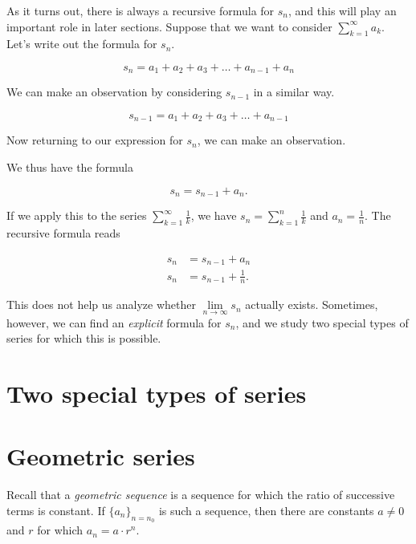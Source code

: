 \documentclass{ximera}
\begin{document}
As it turns out, there is always a recursive formula for $s_n$, and this will play an important role in later sections.  Suppose that we want to consider $\sum\limits_{k=1}^{\infty} a_k$.  Let's write out the formula for $s_n$.

\[
s_n = a_1+a_2+a_3+\ldots+a_{n-1}+a_n
\]

We can make an observation by considering $s_{n-1}$ in a similar way.

\[
s_{n-1} = a_1+a_2+a_3+\ldots+a_{n-1}
\]

Now returning to our expression for $s_n$, we can make an observation. 
\begin{image}
  \end{image}

We thus have the formula 

\[
s_n = s_{n-1}+a_n.
\]

If we apply this to the series $\sum\limits_{k=1}^{\infty} \frac{1}{k}$, we have $s_n = \sum\limits_{k=1}^n \frac{1}{k}$ and $a_n = \frac{1}{n}$.  The recursive formula reads 

\begin{align*}
s_n &= s_{n-1} +a_n\\
s_n &= s_{n-1} +  \frac{1}{n}.
\end{align*}

This does not help us analyze whether $\lim\limits_{n \to \infty} s_n$ actually exists.  Sometimes, however, we can find an \emph{explicit} formula for $s_n$, and we study two special types of series for which this is possible.

\section{Two special types of series}



\section{Geometric series}
Recall that a \emph{geometric sequence} is a sequence for which the ratio of successive terms is constant.  If $\{a_n\}_{n=n_0}$ is such a sequence, then there are constants $a \ne 0$ and $r$ for which $a_n = a\cdot r^n$.  
\end{document}
